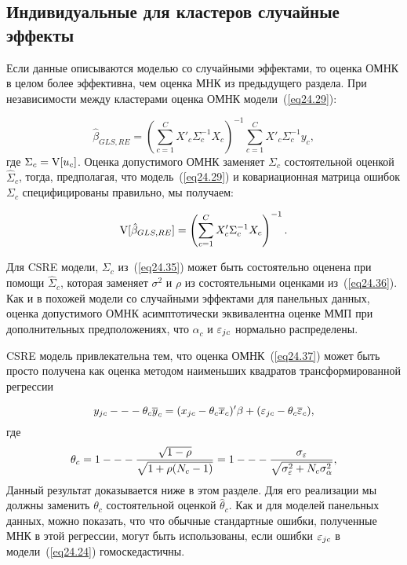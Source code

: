 \subsection{Индивидуальные для кластеров случайные эффекты}

Если данные описываются моделью со случайными эффектами, то оценка ОМНК в целом более эффективна, чем оценка МНК из предыдущего раздела. При независимости между кластерами оценка ОМНК модели~(\ref{eq24.29}):

\begin{equation}
\label{eq24.37}
\hat \beta_{GLS,RE} = \left( \sum_{c=1}^C X'_c \Sigma_c^{-1} X_c \right)^{-1} \sum_{c=1}^C  X'_c \Sigma_c^{-1} y_c,
\end{equation}
где $ \Sigma_c = \mathrm{V}[u_c]$. Оценка допустимого ОМНК заменяет $ \Sigma_c$ состоятельной оценкой $ \hat \Sigma_c$, тогда, предполагая, что модель~(\ref{eq24.29}) и ковариационная матрица ошибок $ \Sigma_c$ специфицированы правильно, мы получаем:

$$
\mathrm{V}[\hat \beta_{GLS,RE}] = \left( \sum_{c=1}^C X'_c \Sigma_c^{-1} X_c \right)^{-1}.
$$

Для CSRE модели, $ \Sigma_c$ из~(\ref{eq24.35}) может быть состоятельно оценена при помощи $ \hat \Sigma_c$, которая заменяет $\sigma^2$ и $\rho$ из состоятельными оценками из~(\ref{eq24.36}). Как и в похожей модели со случайными эффектами для панельных данных, оценка допустимого ОМНК асимптотически эквивалентна оценке ММП при дополнительных предположениях, что $\alpha_c$ и $\varepsilon_{jc}$ нормально распределены. 

CSRE модель привлекательна тем, что оценка ОМНК~(\ref{eq24.37}) может быть просто получена как оценка методом наименьших квадратов трансформированной регрессии

\begin{equation}
\label{eq24.38}
y_{jc} --- \theta_c \overline{y}_c = (x_{jc} -\theta_c \overline{x}_c)' \beta + (\varepsilon_{jc} -\theta_c \overline{\varepsilon}_c),
\end{equation}
где
\begin{equation}
\label{eq24.39}
\theta_c = 1 --- \frac{\sqrt{1-\rho}}{\sqrt{1+\rho(N_c-1)}} = 1 --- \frac{\sigma_{\varepsilon}}{\sqrt{\sigma_{\varepsilon}^2 + N_c \sigma_{\alpha}^2}},
\end{equation}
Данный результат доказывается ниже в этом разделе. Для его реализации мы должны заменить $\theta_c$ состоятельной оценкой $\hat \theta_c$. Как и для моделей панельных данных, можно показать, что что обычные стандартные ошибки, полученные МНК в этой регрессии, могут быть использованы, если ошибки $\varepsilon_{jc}$ в модели~(\ref{eq24.24}) гомоскедастичны. 

